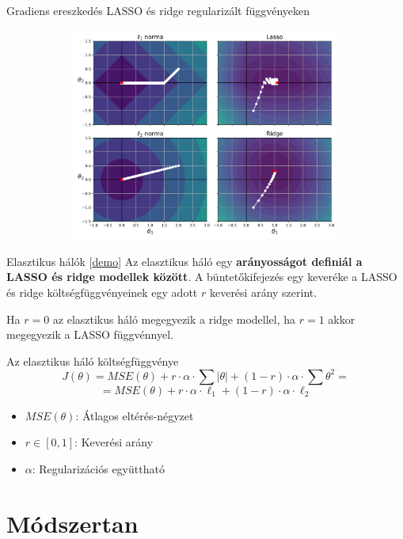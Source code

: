 \documentclass[english, aspectratio=169]{beamer}
\begin{document}
\begin{frame}{Gradiens ereszkedés LASSO és ridge regularizált függvényeken}
\begin{center}
\includegraphics[width=14cm, height=7cm, keepaspectratio]{images/regularization_15.png}
\end{center}
\end{frame}

\begin{frame}{Elasztikus hálók [\href{https://www.geogebra.org/m/j9kh3ju2}{demo}]}
Az elasztikus háló egy \textbf{arányosságot definiál a LASSO és ridge modellek között}. A büntetőkifejezés egy keveréke a LASSO és ridge költségfüggvényeinek egy adott $r$ keverési arány szerint.\par\smallskip
Ha $r=0$ az elasztikus háló megegyezik a ridge modellel, ha $r=1$ akkor megegyezik a LASSO függvénnyel. 
\begin{block}{Az elasztikus háló költségfüggvénye}
\[
J\left( \theta \right) = MSE\left( \theta \right) + r \cdot \alpha \cdot \sum \left|\theta\right| + \left( 1-r \right) \cdot \alpha \cdot \sum \theta^2 = 
\]
\[
= MSE\left( \theta \right) + r \cdot \alpha \cdot \ell_1 + \left( 1 - r \right) \cdot \alpha \cdot \ell_2
\]
\vspace{-.4cm}
\begin{itemize}
	\item $MSE\left( \theta \right)$: Átlagos eltérés-négyzet
	\item $r \in \left[ 0, 1 \right]$: Keverési arány
	\item $\alpha$: Regularizációs együttható
\end{itemize}
\end{block}
\end{frame}

\section{Módszertan}
\end{document}

